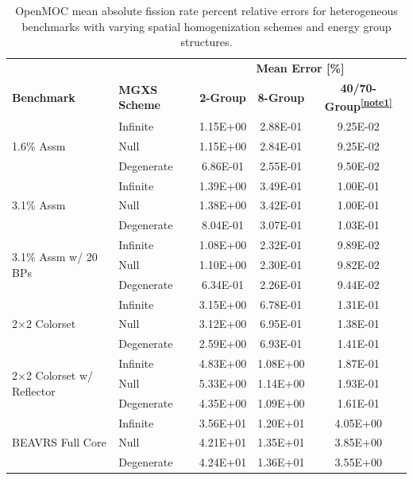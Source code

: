 \begin{table}[ht!]
  \centering
  \caption[Mean OpenMOC fission rate errors]{OpenMOC mean absolute fission rate percent relative errors for heterogeneous benchmarks with varying spatial homogenization schemes and energy group structures.}
  \small
  \label{table:chap8-openmoc-mean-fiss-rates}
  \vspace{6pt}
  \begin{tabular}{l l c c c}
  \toprule
  \rowcolor{lightgray}
  & & \multicolumn{3}{c}{\cellcolor{lightgray} \textbf{Mean Error [\%]}} \\
  \multirow{-2}{*}{\cellcolor{lightgray} \bf Benchmark} &
  \multirow{-2}{*}{\cellcolor{lightgray} \bf \ac{MGXS} Scheme} &
  \multicolumn{1}{c}{{\cellcolor{lightgray} \bf 2-Group}} &
  \multicolumn{1}{c}{{\cellcolor{lightgray} \bf 8-Group}} &
  \multicolumn{1}{c}{{\cellcolor{lightgray} \bf 40/70-Group\textsuperscript{\ref{note1}}}} \\
  \midrule
\multirow{3}{*}{\parbox{2.5cm}{1.6\% Assm}} & Infinite & 1.15E+00 & 2.88E-01 & 9.25E-02 \\
& Null & 1.15E+00 & 2.84E-01 & 9.25E-02 \\
& Degenerate & 6.86E-01 & 2.55E-01 & 9.50E-02 \\
  \midrule
\multirow{3}{*}{\parbox{2.5cm}{3.1\% Assm}} & Infinite & 1.39E+00 & 3.49E-01 & 1.00E-01 \\
& Null & 1.38E+00 & 3.42E-01 & 1.00E-01 \\
& Degenerate & 8.04E-01 & 3.07E-01 & 1.03E-01 \\
  \midrule
\multirow{3}{*}{\parbox{2.5cm}{3.1\% Assm w/ 20 BPs}} & Infinite & 1.08E+00 & 2.32E-01 & 9.89E-02 \\
& Null & 1.10E+00 & 2.30E-01 & 9.82E-02 \\
& Degenerate & 6.34E-01 & 2.26E-01 & 9.44E-02 \\
  \midrule
\multirow{3}{*}{\parbox{2.5cm}{2$\times$2 Colorset}} & Infinite & 3.15E+00 & 6.78E-01 & 1.31E-01 \\
& Null & 3.12E+00 & 6.95E-01 & 1.38E-01 \\
& Degenerate & 2.59E+00 & 6.93E-01 & 1.41E-01 \\
  \midrule
\multirow{3}{*}{\parbox{2.5cm}{2$\times$2 Colorset w/ Reflector}} & Infinite & 4.83E+00 & 1.08E+00 & 1.87E-01 \\
& Null & 5.33E+00 & 1.14E+00 & 1.93E-01 \\
& Degenerate & 4.35E+00 & 1.09E+00 & 1.61E-01 \\
  \midrule
\multirow{3}{*}{\parbox{2.5cm}{BEAVRS Full Core}} & Infinite & 3.56E+01 & 1.20E+01 & 4.05E+00 \\
& Null & 4.21E+01 & 1.35E+01 & 3.85E+00 \\
& Degenerate & 4.24E+01 & 1.36E+01 & 3.55E+00 \\
  \bottomrule
\end{tabular}
\end{table}

